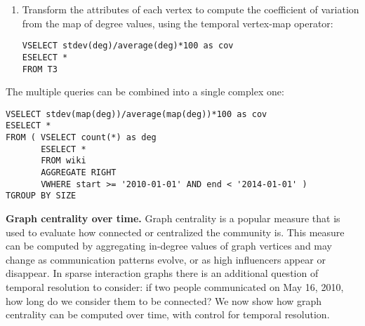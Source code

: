 \begin{enumerate}[noitemsep,itemindent=\dimexpr\labelwidth+\labelsep\relax,leftmargin=0pt]
\item Transform the attributes of each vertex to compute the
  coefficient of variation from the map of degree values, using the
  temporal vertex-map operator:

\vspace{-0.1cm}
\begin{small} 
\begin{verbatim}
VSELECT stdev(deg)/average(deg)*100 as cov
ESELECT *
FROM T3
\end{verbatim}
\end{small}
\end{enumerate}

The multiple queries can be combined into a single complex one:

\vspace{-0.1cm}
\begin{small} 
\begin{verbatim}
VSELECT stdev(map(deg))/average(map(deg))*100 as cov
ESELECT *
FROM ( VSELECT count(*) as deg
       ESELECT *
       FROM wiki
       AGGREGATE RIGHT
       VWHERE start >= '2010-01-01' AND end < '2014-01-01' )
TGROUP BY SIZE
\end{verbatim}
\end{small}

{\bf Graph centrality over time.} Graph centrality is a popular
measure that is used to evaluate how connected or centralized the
community is.  This measure can be computed by aggregating in-degree
values of graph vertices and may change as communication patterns evolve, or as high
influencers appear or disappear. In sparse interaction graphs there is
an additional question of temporal resolution to consider: if two
people communicated on May 16, 2010, how long do we consider them to
be connected?  We now show how graph centrality can be computed over
time, with control for temporal resolution.



